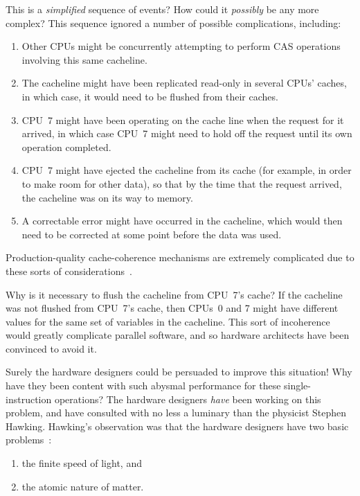 \QuickQ{}
	This is a \emph{simplified} sequence of events?
	How could it \emph{possibly} be any more complex?
\QuickA{}
	This sequence ignored a number of possible complications,
	including:

	\begin{enumerate}
	\item	Other CPUs might be concurrently attempting to perform
		CAS operations involving this same cacheline.
	\item	The cacheline might have been replicated read-only in
		several CPUs' caches, in which case, it would need to
		be flushed from their caches.
	\item	CPU~7 might have been operating on the cache line when
		the request for it arrived, in which case CPU~7 might
		need to hold off the request until its own operation
		completed.
	\item	CPU~7 might have ejected the cacheline from its cache
		(for example, in order to make room for other data),
		so that by the time that the request arrived, the
		cacheline was on its way to memory.
	\item	A correctable error might have occurred in the cacheline,
		which would then need to be corrected at some point before
		the data was used.
	\end{enumerate}

	Production-quality cache-coherence mechanisms are extremely
	complicated due to these sorts of
	considerations~\cite{Hennessy95a,DavidECuller1999,MiloMKMartin2012scale,DanielJSorin2011MemModel}.


\QuickQ{}
	Why is it necessary to flush the cacheline from CPU~7's cache?
\QuickA{}
	If the cacheline was not flushed from CPU~7's cache, then
	CPUs~0 and 7 might have different values for the same set
	of variables in the cacheline.
	This sort of incoherence would greatly complicate parallel
	software, and so hardware architects have been convinced to
	avoid it.

\QuickQ{}
	Surely the hardware designers could be persuaded to improve
	this situation!
	Why have they been content with such abysmal performance
	for these single-instruction operations?
\QuickA{}
	The hardware designers \emph{have} been working on this
	problem, and have consulted with no less a luminary than
	the physicist Stephen Hawking.
	Hawking's observation was that the hardware designers have
	two basic problems~\cite{BryanGardiner2007}:

	\begin{enumerate}
	\item	the finite speed of light, and
	\item	the atomic nature of matter.
	\end{enumerate}

